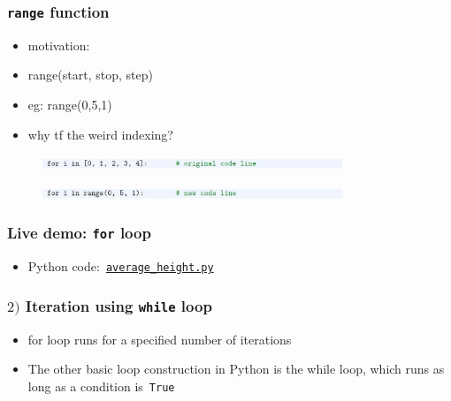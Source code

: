 \documentclass[english,14pt]{beamer}
\begin{document}

\begin{frame}[fragile]

\frametitle{\texttt{range} function}

\begin{itemize}
	\item motivation: 
	\item range(start, stop, step)
	\item eg: range(0,5,1)
	\item why tf the weird indexing?
\end{itemize}

\begin{figure}[ht]
	\centering
	\includegraphics[width=0.8\textwidth]{figures/LLp63a}
\end{figure}

\begin{figure}[ht]
	\centering
	\includegraphics[width=0.8\textwidth]{figures/LLp63b}
\end{figure}

\end{frame}


\begin{frame}[fragile]

\frametitle{Live demo: \texttt{for} loop}

\begin{itemize}
	\item Python code:~\href{https://github.com/slgit/prog4comp_2/blob/master/py36-src/average_height.py}{\texttt{average\_height.py}}
\end{itemize}

\end{frame}


\begin{frame}[fragile]

\frametitle{$2)$ Iteration using \texttt{while} loop}

\begin{itemize}
	\item for loop runs for a specified number of iterations
	\item The other basic loop construction in Python is the while loop, which runs as long as a condition is~\texttt{True}

\end{itemize}

\end{frame}
\end{document}
